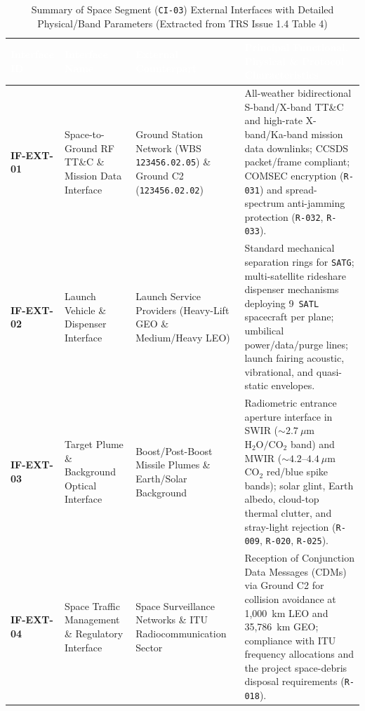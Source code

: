 \documentclass[11pt,a4paper]{article}
\newcommand{\thead}[1]{\textcolor{white}{\textbf{\textsf{#1}}}}
\providecommand{\abbr}[1]{#1}
\begin{document}
\begin{table}[H]
\centering
\caption{Summary of Space Segment (\texttt{CI-03}) External Interfaces with Detailed Physical/Band Parameters (Extracted from TRS Issue 1.4 Table 4)}
\label{tab:sseg_external_interfaces_archived}
{\footnotesize\setlength{\tabcolsep}{4pt}\renewcommand{\arraystretch}{1.12}%
%
%
\noindent
\begin{tabularx}{\textwidth}{|>{\raggedright\arraybackslash}p{1.9cm}|>{\raggedright\arraybackslash}p{3.1cm}|>{\raggedright\arraybackslash}p{2.9cm}|>{\raggedright\arraybackslash}X|}
    \hline
    \rowcolor{TableHeaderBlue}
    \thead{Interface ID} & \thead{Interface Name} & \thead{External Counterpart} & \thead{Principal Functional, Physical \& Protocol Characteristics} \\ \hline
    \textbf{IF-EXT-01} & Space-to-Ground \abbr{RF} \abbr{TT\&C} \& Mission Data Interface & Ground Station Network (\abbr{WBS} \texttt{123456.02.05}) \& Ground C2 (\texttt{123456.02.02}) & All-weather bidirectional S-band/X-band \abbr{TT\&C} and high-rate X-band/Ka-band mission data downlinks; \abbr{CCSDS} packet/frame compliant; \abbr{COMSEC} encryption (\texttt{R-031}) and spread-spectrum anti-jamming protection (\texttt{R-032}, \texttt{R-033}). \\ \hline
    \textbf{IF-EXT-02} & Launch Vehicle \& Dispenser Interface & Launch Service Providers (Heavy-Lift \abbr{GEO} \& Medium/Heavy \abbr{LEO}) & Standard mechanical separation rings for \texttt{SATG}; multi-satellite rideshare dispenser mechanisms deploying 9~\texttt{SATL} spacecraft per plane; umbilical power/data/purge lines; launch fairing acoustic, vibrational, and quasi-static envelopes. \\ \hline
    \textbf{IF-EXT-03} & Target Plume \& Background Optical Interface & Boost/Post-Boost Missile Plumes \& Earth/Solar Background & Radiometric entrance aperture interface in \abbr{SWIR} ($\sim 2.7~\mu\mathrm{m}$ $\mathrm{H_2O}/\mathrm{CO_2}$ band) and \abbr{MWIR} ($\sim 4.2\text{--}4.4~\mu\mathrm{m}$ $\mathrm{CO_2}$ red/blue spike bands); solar glint, Earth albedo, cloud-top thermal clutter, and stray-light rejection (\texttt{R-009}, \texttt{R-020}, \texttt{R-025}). \\ \hline
    \textbf{IF-EXT-04} & Space Traffic Management \& Regulatory Interface & Space Surveillance Networks \& \abbr{ITU} Radiocommunication Sector & Reception of Conjunction Data Messages (CDMs) via Ground C2 for collision avoidance at 1,000~km \abbr{LEO} and 35,786~km \abbr{GEO}; compliance with \abbr{ITU} frequency allocations and the project space-debris disposal requirements (\texttt{R-018}). \\ \hline
\end{tabularx}}
\end{table}
\end{document}

